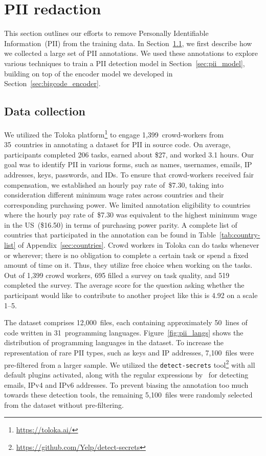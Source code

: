 \section{PII redaction}\label{sec:PII}
This section outlines our efforts to remove Personally Identifiable Information~(PII) from the training data. In Section~\ref{sec:pii_datacollection}, we first describe how we collected a large set of PII annotations. We used these annotations to explore various techniques to train a PII detection model in Section~\ref{sec:pii_model}, building on top of the encoder model we developed in Section~\ref{sec:bigcode_encoder}. 

\subsection{Data collection}\label{sec:pii_datacollection}
We utilized the Toloka platform\footnote{\url{https://toloka.ai/}} to engage 1,399~crowd-workers from 35~countries in annotating a dataset for PII in source code. On average, participants completed 206 tasks, earned about \$27, and worked 3.1 hours. Our goal was to identify PII in various forms, such as names, usernames, emails, IP addresses, keys, passwords, and IDs. To ensure that crowd-workers received fair compensation, we established an hourly pay rate of~\$7.30, taking into consideration different minimum wage rates across countries and their corresponding purchasing power. We limited annotation eligibility to countries where the hourly pay rate of~\$7.30 was equivalent to the highest minimum wage in the US~(\$16.50) in terms of purchasing power parity. A complete list of countries that participated in the annotation can be found in Table~\ref{tab:country-list} of Appendix~\ref{sec:countries}. Crowd workers in Toloka can do tasks whenever or wherever; there is no obligation to complete a certain task or spend a fixed amount of time on it. Thus, they utilize free choice when working on the tasks. Out of 1,399 crowd workers, 695 filled a survey on task quality, and 519 completed the survey. The average score for the question asking whether the participant would like to contribute to another project like this is 4.92 on a scale 1--5. 

The dataset comprises 12,000~files, each containing approximately 50~lines of code written in 31~programming languages. Figure~\ref{fig:pii_langs} shows the distribution of programming languages in the dataset. To increase the representation of rare PII types, such as keys and IP addresses, 7,100~files were pre-filtered from a larger sample. We utilized the \texttt{detect-secrets} tool\footnote{\url{https://github.com/Yelp/detect-secrets}} with all default plugins activated, along with the regular expressions by~\citet{allal2023santacoder} for detecting emails, IPv4 and IPv6 addresses. To prevent biasing the annotation too much towards these detection tools, the remaining 5,100~files were randomly selected from the dataset without pre-filtering.

